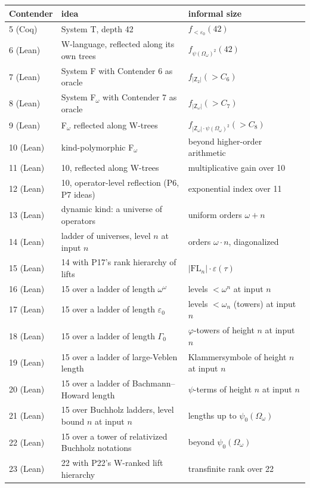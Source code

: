 \documentclass[11pt]{article}
\theoremstyle{definition}
\theoremstyle{remark}
\begin{document}
\begin{center}
\begin{tabular}{lll}
\toprule
Contender & idea & informal size\\
\midrule
5 (Coq) & System T, depth 42 & $f_{<\varepsilon_0}(42)$\\
6 (Lean) & W-language, reflected along its own trees & $f_{\psi(\Omega_\omega)^2}(42)$\\
7 (Lean) & System F with Contender 6 as oracle & $f_{|\mathsf{Z}_2|}(>\!C_6)$\\
8 (Lean) & System F$_\omega$ with Contender 7 as oracle & $f_{|\mathsf{Z}_\omega|}(>\!C_7)$\\
9 (Lean) & F$_\omega$ reflected along W-trees & $f_{|\mathsf{Z}_\omega|\cdot\psi(\Omega_\omega)^2}(>\!C_8)$\\
10 (Lean) & kind-polymorphic F$_\omega$ & beyond higher-order arithmetic\\
11 (Lean) & 10, reflected along W-trees & multiplicative gain over 10\\
12 (Lean) & 10, operator-level reflection (P6, P7 ideas) & exponential index over 11\\
13 (Lean) & dynamic kind: a universe of operators & uniform orders $\omega+n$\\
14 (Lean) & ladder of universes, level $n$ at input $n$ & orders $\omega\cdot n$, diagonalized\\
15 (Lean) & 14 with P17's rank hierarchy of lifts & $|\mathrm{FL}_n|\cdot\varepsilon(\tau)$\\
16 (Lean) & 15 over a ladder of length $\omega^\omega$ & levels $<\omega^{n}$ at input $n$\\
17 (Lean) & 15 over a ladder of length $\varepsilon_0$ & levels $<\omega_n$ (towers) at input $n$\\
18 (Lean) & 15 over a ladder of length $\Gamma_0$ & $\varphi$-towers of height $n$ at input $n$\\
19 (Lean) & 15 over a ladder of large-Veblen length & Klammersymbole of height $n$ at input $n$\\
20 (Lean) & 15 over a ladder of Bachmann--Howard length & $\psi$-terms of height $n$ at input $n$\\
21 (Lean) & 15 over Buchholz ladders, level bound $n$ at input $n$ & lengths up to $\psi_0(\Omega_\omega)$\\
22 (Lean) & 15 over a tower of relativized Buchholz notations & beyond $\psi_0(\Omega_\omega)$\\
23 (Lean) & 22 with P22's W-ranked lift hierarchy & transfinite rank over 22\\

\end{tabular}
\end{center}
\end{document}
